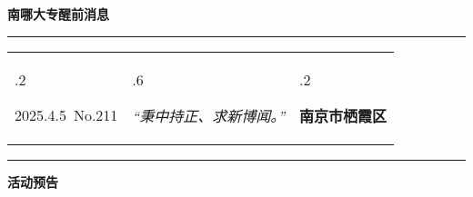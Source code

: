 \documentclass[letterpaper, 12pt]{article}
\begin{document}
\begin{center}
    \Huge\textbf{南哪大专醒前消息}
\end{center}
\vspace{4mm}
\hrule
\renewcommand\tabularxcolumn[1]{m{#1}}
\begin{tabularx}{\textwidth}{>{\hsize.2\hsize}X>{\hsize.6\hsize}X>{\hsize.2\hsize}X}
    \begin{flushleft}
        2025.4.5\, No.211
    \end{flushleft}
    &
    \begin{center}
        \textit{“秉中持正、求新博闻。”}
    \end{center}
    &
    \begin{flushright}
        \textbf{南京市栖霞区}
    \end{flushright}
\end{tabularx}
\vspace{-3.5mm}
\hrule
\vspace{4mm}
\centerline{\huge\textbf{活动预告}}
\end{document}
